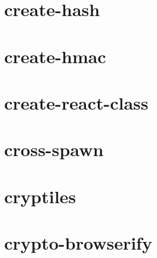 \documentclass[twoside]{book}
\newcommand{\+}{\discretionary{\mbox{\scriptsize$\hookleftarrow$}}{}{}}
\begin{document}
\chapter{create-\/hash}
\label{md__c_1_workspace_demo_src_main_script_node_modules_create-hash_readme}

\chapter{create-\/hmac}
\label{md__c_1_workspace_demo_src_main_script_node_modules_create-hmac__r_e_a_d_m_e}

\chapter{create-\/react-\/class}
\label{md__c_1_workspace_demo_src_main_script_node_modules_create-react-class__r_e_a_d_m_e}

\chapter{cross-\/spawn}
\label{md__c_1_workspace_demo_src_main_script_node_modules_cross-spawn__r_e_a_d_m_e}

\chapter{cryptiles}
\label{md__c_1_workspace_demo_src_main_script_node_modules_cryptiles__r_e_a_d_m_e}

\chapter{crypto-\/browserify}
\label{md__c_1_workspace_demo_src_main_script_node_modules_crypto-browserify__r_e_a_d_m_e}

\end{document}
